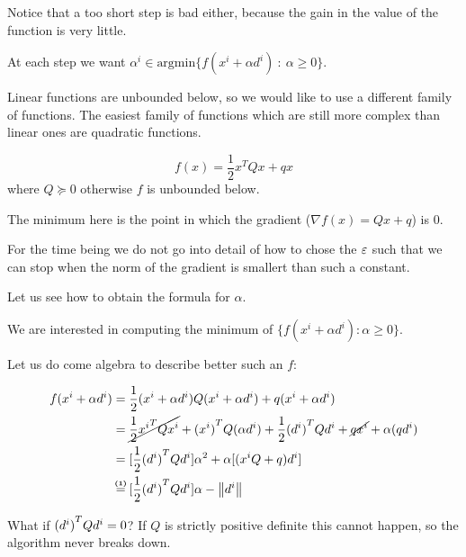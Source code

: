 \documentclass[computational_mathematics.tex]{subfiles}
\begin{document}
Notice that a too short step is bad either, because the gain in the value of the function is very little.

At each step we want $\alpha^i \in \mbox{argmin} \{f(x^i + \alpha d^i)~:~\alpha \geq 0\}$.

Linear functions are unbounded below, so we would like to use a different family of functions. The easiest family of functions which are still more complex than linear ones are quadratic functions.

\[
  f(x) = \frac{1}{2} x^T Q x + q x
\]
where $Q \succeq 0$ otherwise $f$ is unbounded below.

The minimum here is the point in which the gradient ($\nabla f(x) = Qx + q$) is $0$.


For the time being we do not go into detail of how to chose the $\varepsilon$ such that we can stop when the norm of the gradient is smallert than such a constant.

Let us see how to obtain the formula for $\alpha$.

We are interested in computing the minimum of $\{ f(x^i + \alpha d^i) : \alpha \ge 0\}$.

Let us do come algebra to describe better such an $f$:

\begin{equation}
  \begin{split}
    f(x^i + \alpha d^i) &= \frac{1}{2} (x^i + \alpha d^i) Q (x^i + \alpha d^i) + q (x^i + \alpha d^i)\\
    &= \cancel{\frac{1}{2} \tr{x^i}Q x^i}  + \tr{(x^i)} Q (\alpha d^i) + \frac{1}{2} \tr{(d^i)} Q d^i + \cancel{q x^i} + \alpha (q d^i)\\
    &= [\frac{1}{2} \tr{(d^i)} Q d^i] \alpha^2  + \alpha [(x^i Q + q) d^i]\\
    &\numeq{(1)} [\frac{1}{2} \tr{(d^i)} Q d^i] \alpha  - \norm{d^i}\\
  \end{split}
\end{equation}

What if ${(d^i)}^{T} Q d^i = 0$? If $Q$ is strictly positive definite this cannot happen, so the algorithm never breaks down.
\end{document}
